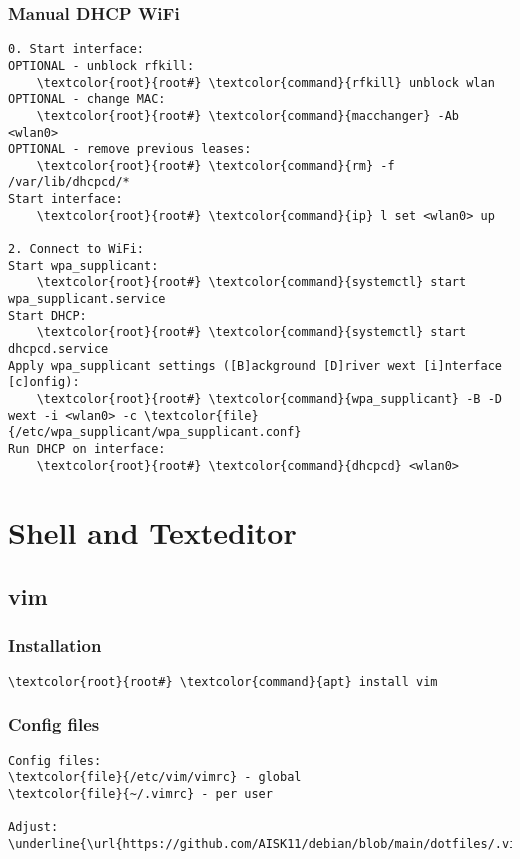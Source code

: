 \documentclass[10pt, a4paper, onecolumn, openany]{book} %
\begin{document}
\subsection{Manual DHCP WiFi}
\begin{Verbatim}[commandchars=\\\{\}]
0. Start interface:
OPTIONAL - unblock rfkill:
    \textcolor{root}{root#} \textcolor{command}{rfkill} unblock wlan
OPTIONAL - change MAC:
    \textcolor{root}{root#} \textcolor{command}{macchanger} -Ab <wlan0>
OPTIONAL - remove previous leases:
    \textcolor{root}{root#} \textcolor{command}{rm} -f /var/lib/dhcpcd/*
Start interface:
    \textcolor{root}{root#} \textcolor{command}{ip} l set <wlan0> up

2. Connect to WiFi:
Start wpa_supplicant:
    \textcolor{root}{root#} \textcolor{command}{systemctl} start wpa_supplicant.service
Start DHCP:
    \textcolor{root}{root#} \textcolor{command}{systemctl} start dhcpcd.service
Apply wpa_supplicant settings ([B]ackground [D]river wext [i]nterface [c]onfig):
    \textcolor{root}{root#} \textcolor{command}{wpa_supplicant} -B -D wext -i <wlan0> -c \textcolor{file}{/etc/wpa_supplicant/wpa_supplicant.conf}
Run DHCP on interface:
    \textcolor{root}{root#} \textcolor{command}{dhcpcd} <wlan0>
\end{Verbatim}



\chapter{Shell and Texteditor}
\section{vim}
\subsection{Installation}
\begin{Verbatim}[commandchars=\\\{\}]
    \textcolor{root}{root#} \textcolor{command}{apt} install vim
\end{Verbatim}
\subsection{Config files}
\begin{Verbatim}[commandchars=\\\{\}]
Config files:
\textcolor{file}{/etc/vim/vimrc} - global
\textcolor{file}{~/.vimrc} - per user

Adjust:
\underline{\url{https://github.com/AISK11/debian/blob/main/dotfiles/.vimrc}}
\end{Verbatim}
\end{document}
